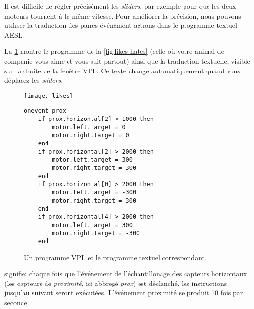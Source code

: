\label{a.tech}


Il est difficile de régler précisément les \emph{sliders}, par exemple pour que les deux
moteurs tournent à la même vitesse.
Pour améliorer la précision, nous pouvons utiliser la traduction des paires événement-actions
dans le programme textuel AESL.


La \cref{fig.textcode} montre le programme de la \cref{fig.likes-hates} (celle où votre animal
de companie vous aime et vous suit partout) ainsi que la traduction textuelle, visible sur la droite
de la fenêtre VPL.
Ce texte change automatiquement quand vous déplacez les \emph{sliders}.

\begin{figure}[hbt]
\texttt{[image: likes]}
\hfill
\begin{minipage}[b]{0.55\textwidth}
\begin{footnotesize}
\begin{verbatim}
onevent prox
    if prox.horizontal[2] < 1000 then
        motor.left.target = 0
        motor.right.target = 0
    end
    if prox.horizontal[2] > 2000 then
        motor.left.target = 300
        motor.right.target = 300
    end
    if prox.horizontal[0] > 2000 then
        motor.left.target = -300
        motor.right.target = 300
    end
    if prox.horizontal[4] > 2000 then
        motor.left.target = 300
        motor.right.target = -300
    end
\end{verbatim}
\end{footnotesize}
\vspace*{8ex}
\end{minipage}
\caption{Un programme VPL et le programme textuel correspondant.}
\label{fig.textcode}
\end{figure}

 signifie: chaque fois que l'événement de l'échantillonage des capteurs horizontaux
(les capteurs de \emph{proximité}, ici abbregé \emph{prox}) est déclanché,
les instructions jusqu'au  suivant seront exécutées.
L'événement proximité se produit 10 fois par seconde.


